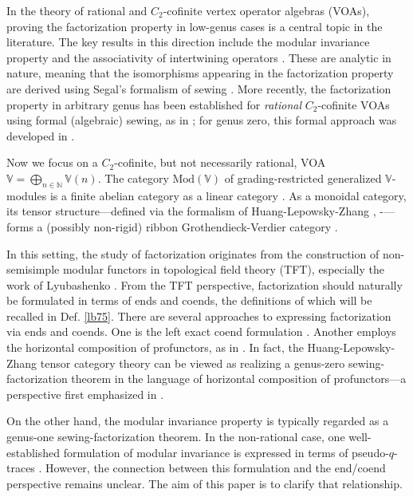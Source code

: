 \documentclass[11pt,b5paper,notitlepage]{article}
\theoremstyle{definition}
\theoremstyle{plain}
\newcommand{\Vbb}{\mathbb V}
\newcommand{\Nbb}{\mathbb N}
\newcommand{\<}{\left\langle}
\renewcommand{\>}{\right\rangle}
\newcommand{\Mod}{\mathrm{Mod}}
\numberwithin{equation}{section}
\begin{document}
In the theory of rational and $C_2$-cofinite vertex operator algebras (VOAs), proving the factorization property in low-genus cases is a central topic in the literature. The key results in this direction include the modular invariance property \cite{Zhu-modular-invariance, Hua-differential-genus-1} and the associativity of intertwining operators \cite{Hua-tensor-4, Hua-differential-genus-0}. These are analytic in nature, meaning that the isomorphisms appearing in the factorization property are derived using Segal’s formalism of sewing \cite{Segal-CFT1, Segal-CFT2}. More recently, the factorization property in arbitrary genus has been established for \textit{rational} $C_2$-cofinite VOAs using formal (algebraic) sewing, as in \cite{DGT2}; for genus zero, this formal approach was developed in \cite{NT-P1_conformal_blocks}.


Now we focus on a $C_2$-cofinite, but not necessarily rational, VOA $\Vbb=\bigoplus_{n\in\Nbb}\Vbb(n)$. The category $\Mod(\Vbb)$ of grading-restricted generalized $\Vbb$-modules is a finite abelian category as a linear category \cite{MNT10, Hua-projectivecover}. As a monoidal category, its tensor structure---defined via the formalism of Huang-Lepowsky-Zhang \cite{HLZ1}, \cite{HLZ2}-\cite{HLZ8}---forms a (possibly non-rigid) ribbon Grothendieck-Verdier category \cite{ALSW21}. 

In this setting, the study of factorization originates from the construction of non-semisimple modular functors in topological field theory (TFT), especially the work of Lyubashenko \cite{Lyu95-Invariants, Lyu96-Ribbon}. From the TFT perspective, factorization should naturally be formulated in terms of ends and coends, the definitions of which will be recalled in Def. \ref{lb75}. There are several approaches to expressing factorization via ends and coends. One is the left exact coend formulation \cite{Lyu95-Invariants, Lyu96-Ribbon,FS-coends-CFT}. Another employs the horizontal composition of profunctors, as in \cite{HR24-MF}. In fact, the Huang-Lepowsky-Zhang tensor category theory can be viewed as realizing a genus-zero sewing-factorization theorem in the language of horizontal composition of profunctors---a perspective first emphasized in \cite{Moriwaki22-CB}. 

On the other hand, the modular invariance property is typically regarded as a genus-one sewing-factorization theorem. In the non-rational case, one well-established formulation of modular invariance is expressed in terms of pseudo-$q$-traces \cite{Miy-modular-invariance,AN-pseudo-trace,Fio-genus-1,Hua-modular-C2}. However, the connection between this formulation and the end/coend perspective remains unclear. The aim of this paper is to clarify that relationship.
\end{document}
